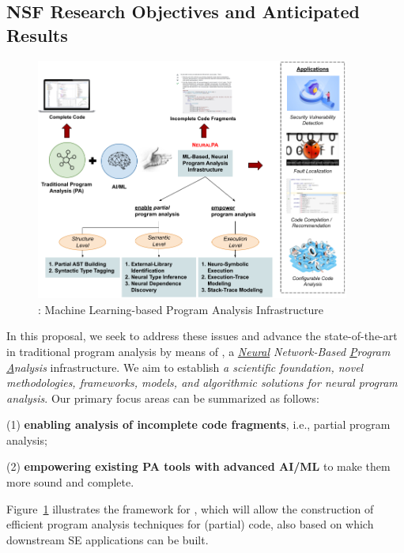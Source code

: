 \subsection{NSF Research Objectives and Anticipated Results}

\begin{figure}[t]
    \centering
    \includegraphics[width=0.92\textwidth]{figures/infra-design-3.png}
    \caption{{\tool}: Machine Learning-based Program Analysis Infrastructure}
    \label{fig:arch}
\end{figure}


In this proposal, we seek to address these issues and advance the state-of-the-art in traditional program analysis by means of {\tool}, a {\em \underline{Neural} Network-Based \underline{P}rogram \underline{A}nalysis} infrastructure. We aim to establish {\em a scientific foundation, novel methodologies, frameworks, models, and algorithmic solutions for neural program analysis}. Our primary focus areas can be summarized as follows: 

(1) {\bf enabling analysis of incomplete code fragments}, i.e., partial program analysis;

(2) {\bf empowering existing PA tools with advanced AI/ML
} to make them more sound and complete.

\noindent Figure~\ref{fig:arch} illustrates the 
framework for {\tool}, which will allow the construction of efficient program analysis techniques for (partial) code, also based on which downstream 
SE applications can be built.


